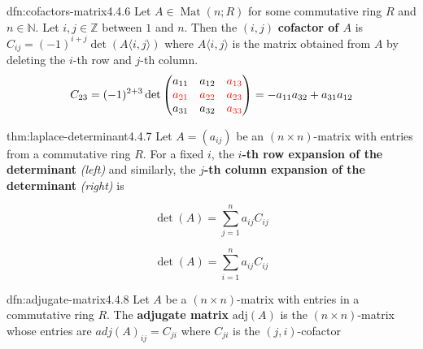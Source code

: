 \documentclass[landscape, 8pt]{extarticle}
\DeclareMathOperator{\Mat}{Mat}
\begin{document}
\begin{multicols}{3}
\vspace{-5pt}
\begin{dfn}{dfn:cofactors-matrix}{4.4.6}
    \vspace{-5pt}
    Let $A \in \Mat(n;R)$ for some commutative ring $R$ and $n\in \mathbb{N}$. Let $i,j\in\mathbb{Z}$ between $1$ and $n$. Then the $(i, j)$ \textbf{cofactor of $A$} is $C_{ij} = (-1)^{i + j} \det(A\langle i,j \rangle)$ where $A\langle i, j \rangle$ is the matrix obtained from $A$ by deleting the $i$-th row and $j$-th column.
    \[C_{23} = (-1)^{2 + 3} \det \begin{pmatrix}
        a_{11} & a_{12}& \textcolor{red}{a_{13}}\\
        \textcolor{red}{a_{21}}& \textcolor{red}{a_{22}}& \textcolor{red}{a_{23}}\\
        a_{31}& a_{32}& \textcolor{red}{a_{33}}
    \end{pmatrix} = -a_{11}a_{32} + a_{31}a_{12}\]
\end{dfn}

\vspace{-4pt}
\begin{thm}{thm:laplace-determinant}{4.4.7}
    Let $A = (a_{ij})$ be an $(n \times n)$-matrix with entries from a commutative ring $R$. For a fixed $i$, the \textbf{$i$-th row expansion of the determinant} \textit{(left)} and similarly, the \textbf{$j$-th column expansion of the determinant} \textit{(right)} is
    
    \vspace{-17pt}
    \setlength{\columnseprule}{0.5pt}
    \begin{multicols}{2}
        \begin{center}
            \[\det(A) = \sum_{j = 1}^{n}a_{ij}C_{ij}\]
        \end{center}

        \columnbreak

        \begin{center}
            \[\det(A) = \sum_{i = 1}^{n} a_{ij} C_{ij}\]
        \end{center}
    \end{multicols}

    \vspace{-6pt}
\end{thm}

\vspace{-5pt}
\begin{dfn}{dfn:adjugate-matrix}{4.4.8}
    Let $A$ be a $(n \times n)$-matrix with entries in a commutative ring $R$. The \textbf{adjugate matrix} $\text{adj}(A)$ is the $(n \times n)$-matrix whose entries are $adj(A)_{ij} = C_{ji}$ where $C_{ji}$ is the $(j, i)$-cofactor
\end{dfn}


\end{multicols}
\end{document}

